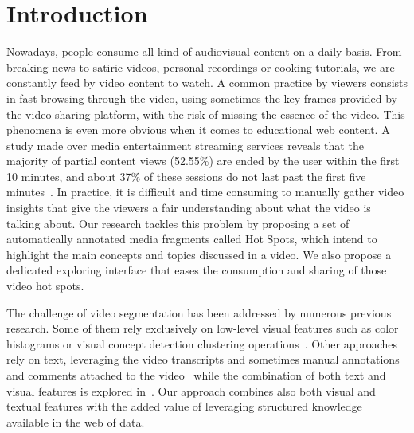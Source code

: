 \documentclass{llncs}
\begin{document}
\section{Introduction}
Nowadays, people consume all kind of audiovisual content on a daily basis. From breaking news to satiric videos, personal recordings or cooking tutorials, we are constantly feed by video content to watch. A common practice by viewers consists in fast browsing through the video, using sometimes the key frames provided by the video sharing platform, with the risk of missing the essence of the video. This phenomena is even more obvious when it comes to educational web content. A study made over media entertainment streaming services reveals that the majority of partial content views (52.55\%) are ended by the user within the first 10 minutes, and about 37\% of these sessions do not last past the first five minutes~\cite{Yu2006}. In practice, it is difficult and time consuming to manually gather video insights that give the viewers a fair understanding about what the video is talking about. Our research tackles this problem by proposing a set of automatically annotated media fragments called Hot Spots, which intend to highlight the main concepts and topics discussed in a video. We also propose a dedicated exploring interface that eases the consumption and sharing of those video hot spots.

The challenge of video segmentation has been addressed by numerous previous research. Some of them rely exclusively on low-level visual features such as color histograms or visual concept detection clustering operations~\cite{snoek2005multimodal}. Other approaches rely on text, leveraging the video transcripts and sometimes manual annotations and comments attached to the video~\cite{chang1992image} while the combination of both text and visual features is explored in~\cite{chang2005combining}. Our approach combines also both visual and textual features with the added value of leveraging structured knowledge available in the web of data.

\end{document}
